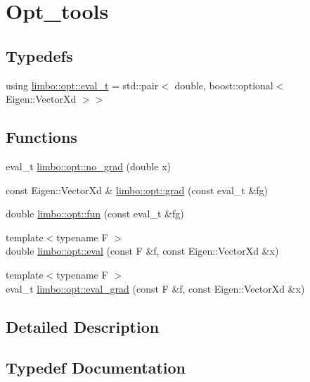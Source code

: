 \hypertarget{group__opt__tools}{}\section{Opt\+\_\+tools}
\label{group__opt__tools}
\subsection*{Typedefs}
\begin{DoxyCompactItemize}
\item 
using \hyperlink{group__opt__tools_ga362b55973a38ac71f27a06f9d9c14f24}{limbo\+::opt\+::eval\+\_\+t} = std\+::pair$<$ double, boost\+::optional$<$ Eigen\+::\+Vector\+Xd $>$$>$
\end{DoxyCompactItemize}
\subsection*{Functions}
\begin{DoxyCompactItemize}
\item 
eval\+\_\+t \hyperlink{group__opt__tools_ga38e53ccac21f452bd31e9b239985d456}{limbo\+::opt\+::no\+\_\+grad} (double x)
\item 
const Eigen\+::\+Vector\+Xd \& \hyperlink{group__opt__tools_gaf28d9af930b2993024ab497b285e0521}{limbo\+::opt\+::grad} (const eval\+\_\+t \&fg)
\item 
double \hyperlink{group__opt__tools_ga68ad00d7501bc26a2a0990bac762393e}{limbo\+::opt\+::fun} (const eval\+\_\+t \&fg)
\item 
{\footnotesize template$<$typename F $>$ }\\double \hyperlink{group__opt__tools_ga698d932ac52cab812742b1300f875372}{limbo\+::opt\+::eval} (const F \&f, const Eigen\+::\+Vector\+Xd \&x)
\item 
{\footnotesize template$<$typename F $>$ }\\eval\+\_\+t \hyperlink{group__opt__tools_ga6abbcdf8d83abca89802881d883fb9e3}{limbo\+::opt\+::eval\+\_\+grad} (const F \&f, const Eigen\+::\+Vector\+Xd \&x)
\end{DoxyCompactItemize}


\subsection{Detailed Description}


\subsection{Typedef Documentation}
